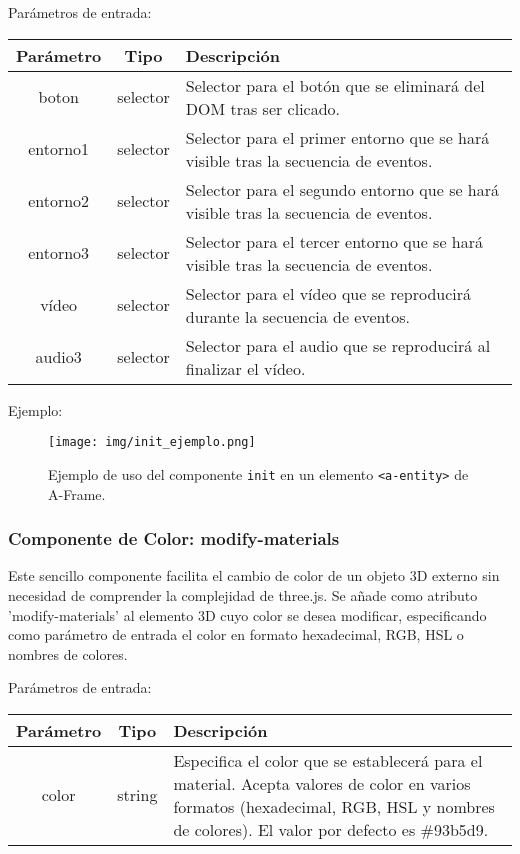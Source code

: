 \documentclass[a4paper, 12pt]{book}
\begin{document}
Parámetros de entrada:

\vspace{1em} 
\begin{tabular}{|c|c|p{10cm}|}
\hline
\textbf{Parámetro} & \textbf{Tipo} & \textbf{Descripción} \\
\hline
boton & selector & Selector para el botón que se eliminará del DOM tras ser clicado. \\
\hline
entorno1 & selector & Selector para el primer entorno que se hará visible tras la secuencia de eventos. \\
\hline
entorno2 & selector & Selector para el segundo entorno que se hará visible tras la secuencia de eventos. \\
\hline
entorno3 & selector & Selector para el tercer entorno que se hará visible tras la secuencia de eventos. \\
\hline
vídeo & selector & Selector para el vídeo que se reproducirá durante la secuencia de eventos. \\
\hline
audio3 & selector & Selector para el audio que se reproducirá al finalizar el vídeo. \\
\hline
\end{tabular}


\vspace{1em} 
Ejemplo:
\begin{figure}[H]
    \centering
    \texttt{[image: img/init\_ejemplo.png]}
    \caption{Ejemplo de uso del componente \texttt{init} en un elemento \texttt{<a-entity>} de A-Frame.}
    \label{fig:init_ejemplo}
\end{figure}


\subsubsection*{Componente de Color: modify-materials}
Este sencillo componente facilita el cambio de color de un objeto 3D externo sin necesidad de comprender la complejidad de three.js. Se añade como atributo 'modify-materials' al elemento 3D cuyo color se desea modificar, especificando como parámetro de entrada el color en formato hexadecimal,
RGB, HSL o nombres de colores.

Parámetros de entrada:

\vspace{1em} 
\begin{tabular}{|c|c|p{10cm}|}
\hline
\textbf{Parámetro} & \textbf{Tipo} & \textbf{Descripción} \\
\hline
color & string &  Especifica el color que se establecerá para el material. Acepta valores de color en varios formatos (hexadecimal, RGB, HSL y nombres de colores). El valor por defecto es \#93b5d9. \\
\hline
\end{tabular}
\end{document}
